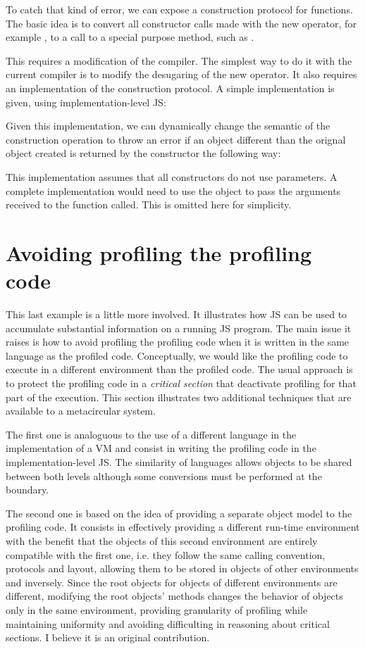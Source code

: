 To catch that kind of error, we can expose a construction protocol for
functions. The basic idea is to convert all constructor calls made with the new
operator, for example , to a call to a special purpose method,
such as .

This requires a modification of the compiler. The simplest way to do it with
the current compiler is to modify the desugaring of the new operator. It also
requires an implementation of the construction protocol. A simple
implementation is given, using implementation-level JS:


Given this implementation, we can dynamically change the semantic of the
construction operation to throw an error if an object different than the
orignal object created is returned by the constructor the following way:


This implementation assumes that all constructors do not use parameters. A
complete implementation would need to use the  object to pass the
arguments received to the function called. This is omitted here for simplicity.

\section{Avoiding profiling the profiling code}

This last example is a little more involved. It illustrates how JS can be used
to accumulate substantial information on a running JS program. The main issue
it raises is how to avoid profiling the profiling code when it is written in
the same language as the profiled code. Conceptually, we would like the
profiling code to execute in a different environment than the profiled code.
The usual approach is to protect the profiling code in a \textit{critical
section} that deactivate profiling for that part of the execution. This section
illustrates two additional techniques that are available to a metacircular
system. 

The first one is analoguous to the use of a different language in the
implementation of a VM and consist in writing the profiling code in the
implementation-level JS. The similarity of languages allows objects to be
shared between both levels although some conversions must be performed at the
boundary. 

The second one is based on the idea of providing a separate object model to the
profiling code. It consists in effectively providing a different run-time
environment with the benefit that the objects of this second environment are
entirely compatible with the first one, i.e. they follow the same calling
convention, protocols and layout, allowing them to be stored in objects of
other environments and inversely. Since the root objects for objects of
different environments are different, modifying the root objects' methods
changes the behavior of objects only in the same environment, providing
granularity of profiling while maintaining uniformity and avoiding difficulting
in reasoning about critical sections. I believe it is an original contribution.

